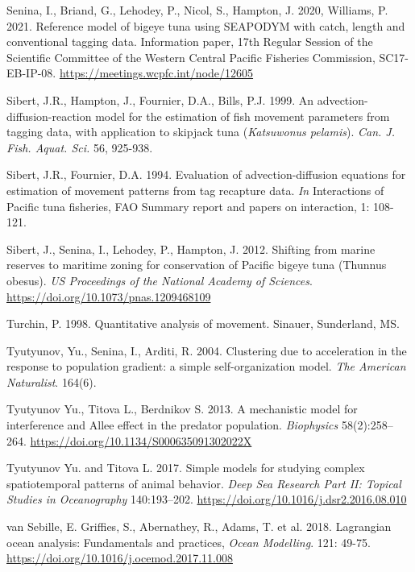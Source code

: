 \begin{thebibliography}{}
 Senina, I., Briand, G., Lehodey, P., Nicol, S., Hampton, J. 2020, Williams, P. 2021. Reference model of bigeye tuna using SEAPODYM with catch, length and conventional tagging data. Information paper, 17th Regular Session of the Scientific Committee of the Western Central Pacific Fisheries Commission, SC17-EB-IP-08. \url{https://meetings.wcpfc.int/node/12605}

 Sibert, J.R., Hampton, J., Fournier, D.A., Bills, P.J. 1999. An advection-diffusion-reaction model for the estimation of fish movement parameters from tagging data, with application to skipjack tuna ({\it Katsuwonus pelamis}). \textit {Can. J. Fish. Aquat. Sci.} 56, 925-938. 

 Sibert, J.R., Fournier, D.A. 1994. Evaluation of advection-diffusion equations for estimation of movement patterns from tag recapture data. \textit{In} Interactions of Pacific tuna fisheries, FAO Summary report and papers on interaction, 1: 108-121.

 Sibert, J., Senina, I., Lehodey, P., Hampton, J. 2012. Shifting from marine reserves to maritime zoning for conservation of Pacific bigeye tuna (Thunnus obesus). \textit{US Proceedings of the National Academy of Sciences}. \url{https://doi.org/10.1073/pnas.1209468109 }

 Turchin, P. 1998. Quantitative analysis of movement. Sinauer, Sunderland, MS.

 Tyutyunov, Yu., Senina, I., Arditi, R. 2004. Clustering due to acceleration in the response to population gradient: a simple self-organization model.  \textit {The American Naturalist}. 164(6).

Tyutyunov Yu., Titova L., Berdnikov S. 2013. A mechanistic model for interference and Allee effect in the predator population. \textit{Biophysics} 58(2):258–264. \url{https://doi.org/10.1134/S000635091302022X}

 Tyutyunov Yu. and Titova L. 2017. Simple models for studying complex spatiotemporal patterns of animal behavior. \textit {Deep Sea Research Part II: Topical Studies in Oceanography} 140:193–202. \url{https://doi.org/10.1016/j.dsr2.2016.08.010}

 van Sebille, E. Griffies, S., Abernathey, R., Adams, T. et al. 2018. Lagrangian ocean analysis: Fundamentals and practices, \textit{Ocean Modelling}. 121: 49-75. \url{https://doi.org/10.1016/j.ocemod.2017.11.008}


\end{thebibliography}
